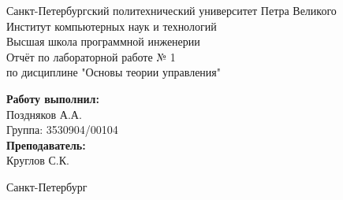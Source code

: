 \begin{titlepage}	%

	\begin{center}		%

		\large Санкт-Петербургский политехнический университет Петра Великого\\
		\large Институт компьютерных наук и технологий \\
		\large Высшая школа программной инженерии\\[8cm]
		
		\huge Отчёт по лабораторной работе № 1\\[0.5cm] %
		\large по дисциплине "Основы теории управления"\\[5cm]

	\end{center}

	\begin{flushright} %
		\begin{minipage}{0.25\textwidth} %
			\begin{flushleft} %

				\large\textbf{Работу выполнил:}\\
				\large Поздняков А.А.\\
				\large {Группа:} 3530904/00104\\
				
				\large \textbf{Преподаватель:}\\
				\large Круглов С.К.

			\end{flushleft}
		\end{minipage}
	\end{flushright}
	
	\vfill %

	\begin{center}
	\large Санкт-Петербург\\
	\large \the\year %
	\end{center} %

\end{titlepage} %

